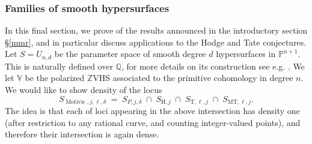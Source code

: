 \documentclass[10pt]{article}
\numberwithin{equation}{section}
\theoremstyle{plain}
\theoremstyle{definition}
\theoremstyle{remark}
\newcommand{\Q}{\mathbb{Q}}
\newcommand{\V}{\mathbb{V}}
\newcommand{\PP}{\mathbb{P}}
\begin{document}
\subsubsection{Families of smooth hypersurfaces}

In this final section, we prove of the results announced in the introductory section \S\ref{mmr}, and in particular discuss applications to the Hodge and Tate conjectures. Let $S=U_{n,d}$ be the parameter space of smooth degree $d$ hypersurfaces in $\PP^{n+1}$. This is naturally defined over $\Q$, for more details on its construction see e.g. \cite{BKU2}. We let $\V$ be the polarized $\mathbb{Z}$VHS associated to the primitive cohomology in degree $n$. We would like to show density of the locus
\[
S_{\operatorname{Motivic}, j,\ell, \delta} \;=\;  S_{P,j,\delta}  \;\cap\;S_{\mathrm{H},j} \;\cap\; S_{\mathrm{T},\ell,j} \;\cap\; S_{\mathrm{MT},\ell,j}.
\]
The idea is that each of loci appearing in the above intersection has density one (after restriction to any rational curve, and counting integer-valued points), and therefore their intersection is again dense.
\end{document}
